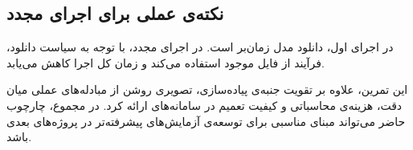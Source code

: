 \documentclass[12pt,a4paper]{article}
\begin{document}
\subsection{نکته‌ی عملی برای اجرای مجدد}
در اجرای اول، دانلود مدل  زمان‌بر است. در اجرای مجدد، با توجه به سیاست  دانلود، فرآیند از فایل موجود استفاده می‌کند و زمان کل اجرا کاهش می‌یابد.

این تمرین، علاوه بر تقویت جنبه‌ی پیاده‌سازی، تصویری روشن از مبادله‌های عملی میان دقت، هزینه‌ی محاسباتی و کیفیت تعمیم در سامانه‌های  ارائه کرد. در مجموع، چارچوب حاضر می‌تواند مبنای مناسبی برای توسعه‌ی آزمایش‌های پیشرفته‌تر در پروژه‌های بعدی باشد.
\end{document}
